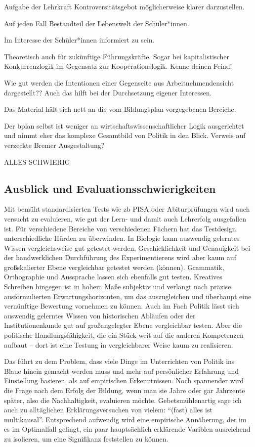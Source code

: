 Aufgabe der Lehrkraft Kontroversitätsgebot möglicherweise klarer darzustellen.

Auf jeden Fall Bestandteil der Lebenswelt der Schüler*innen.

Im Interesse der Schüler*innen informiert zu sein.

Theoretisch auch für zukünftige Führungskräfte. Sogar bei kapitalistischer Konkurrenzlogik im Gegensatz zur Kooperationslogik. Kenne deinen Feind!

Wie gut werden die Intentionen einer Gegenseite aus Arbeitnehmendensicht dargestellt??
Auch das hilft bei der Durchsetzung eigener Interessen.

Das Material hält sich nett an die vom Bildungsplan vorgegebenen Bereiche. 

Der bplan selbst ist weniger an wirtschaftswissenschaftlicher Logik ausgerichtet und nimmt eher das komplexe Gesamtbild von Politik in den Blick.
Verweis auf verzeckte Bremer Ausgestaltung?

ALLES SCHWIERIG

\subsection{Ausblick und Evaluationsschwierigkeiten}
Mit bemüht standardisierten Tests wie \gls{zb} PISA oder Abiturprüfungen wird auch versucht zu evaluieren, wie gut der Lern- und damit auch Lehrerfolg ausgefallen ist. Für verschiedene Bereiche von verschiedenen Fächern hat das Testdesign unterschiedliche Hürden zu überwinden. 
In Biologie kann auswendig gelerntes Wissen vergleichsweise gut getestet werden, Geschicklichkeit und Genauigkeit bei der handwerklichen Durchführung des Experimentierens wird aber kaum auf großskalierter Ebene vergleichbar getestet werden (können).
Grammatik, Orthographie und Aussprache lassen sich ebenfalls gut testen. Kreatives Schreiben hingegen ist in hohem Maße subjektiv und verlangt nach präzise ausformulierten Erwartungshorizonten, um das auszugleichen und überhaupt eine vernünftige Bewertung vornehmen zu können. 
Auch im Fach Politik lässt sich auswendig gelerntes Wissen von historischen Abläufen oder der Institutionenkunde gut auf großangelegter Ebene vergleichbar testen. Aber die politische Handlungsfähigkeit, die ein Stück weit auf die anderen Kompetenzen aufbaut -- dort ist eine Testung in vergleichbarer Weise kaum zu realisieren. 

Das führt zu dem Problem, dass viele Dinge im Unterrichten von Politik ins Blaue hinein gemacht werden muss und mehr auf persönlicher Erfahrung und Einstellung basieren, als auf empirischen Erkenntnissen.
Noch spannender wird die Frage nach dem Erfolg der Bildung, wenn man sie Jahre oder gar Jahrzente später, also die Nachhaltigkeit, evaluieren möchte. Gebetsmühlenartig sage ich auch zu alltäglichen Erklärungsversuchen von vielem: \enquote{(fast) alles ist multikausal}. Entsprechend aufwendig wird eine empirische Annäherung, der im es im Optimalfall gelingt, ein paar hauptsächlich erklärende Variblen ausreichend zu isolieren, um eine Signifikanz feststellen zu können. 


